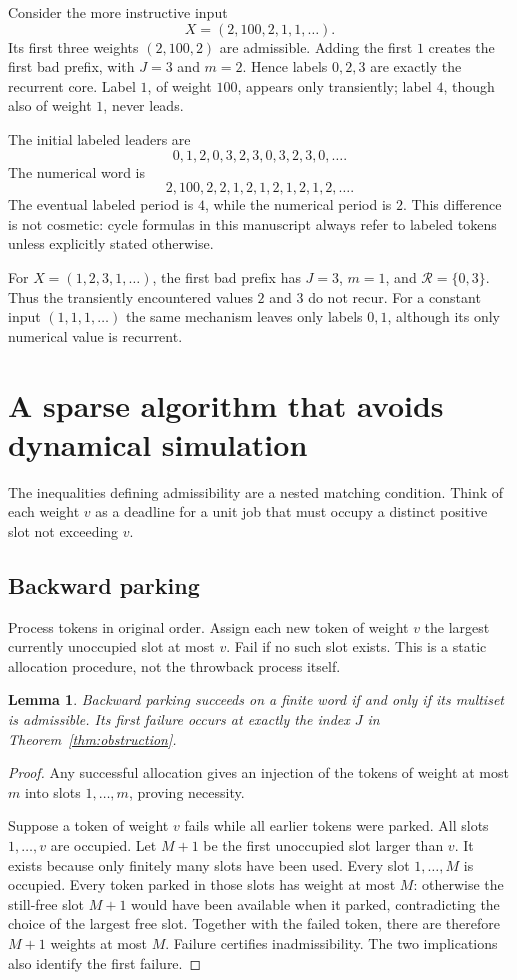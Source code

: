 \documentclass[11pt,letterpaper]{article}
\newtheorem{lemma}[theorem]{Lemma}
\theoremstyle{definition}
\newcommand{\core}{\mathcal R}
\begin{document}
Consider the more instructive input
\begin{equation}\label{eq:example100}
 X=(2,100,2,1,1,\ldots).
\end{equation}
Its first three weights $(2,100,2)$ are admissible. Adding the first $1$
creates the first bad prefix, with $J=3$ and $m=2$. Hence labels $0,2,3$
are exactly the recurrent core. Label $1$, of weight $100$, appears only
transiently; label $4$, though also of weight $1$, never leads.

The initial labeled leaders are
\[
 0,1,2,0,3,2,3,0,3,2,3,0,\ldots.
\]
The numerical word is
\[
 2,100,2,2,1,2,1,2,1,2,1,2,\ldots.
\]
The eventual labeled period is $4$, while the numerical period is $2$.
This difference is not cosmetic: cycle formulas in this manuscript always
refer to labeled tokens unless explicitly stated otherwise.

For $X=(1,2,3,1,\ldots)$, the first bad prefix has $J=3$, $m=1$, and
$\core=\{0,3\}$. Thus the transiently encountered values $2$ and $3$ do not
recur. For a constant input $(1,1,1,\ldots)$ the same mechanism leaves only
labels $0,1$, although its only numerical value is recurrent.

\section{A sparse algorithm that avoids dynamical simulation}\label{sec:algorithm}
The inequalities defining admissibility are a nested matching condition.
Think of each weight $v$ as a deadline for a unit job that must occupy a
distinct positive slot not exceeding $v$.

\subsection{Backward parking}
Process tokens in original order. Assign each new token of weight $v$ the
largest currently unoccupied slot at most $v$. Fail if no such slot exists.
This is a static allocation procedure, not the throwback process itself.

\begin{lemma}\label{lem:parking}
Backward parking succeeds on a finite word if and only if its multiset is
admissible. Its first failure occurs at exactly the index $J$ in
Theorem~\ref{thm:obstruction}.
\end{lemma}
\begin{proof}
Any successful allocation gives an injection of the tokens of weight at most
$m$ into slots $1,\ldots,m$, proving necessity.

Suppose a token of weight $v$ fails while all earlier tokens were parked.
All slots $1,\ldots,v$ are occupied. Let $M+1$ be the first unoccupied slot
larger than $v$. It exists because only finitely many slots have been used.
Every slot $1,\ldots,M$ is occupied. Every token parked in those slots has
weight at most $M$: otherwise the still-free slot $M+1$ would have been
available when it parked, contradicting the choice of the largest free slot.
Together with the failed token, there are therefore $M+1$ weights at most
$M$. Failure certifies inadmissibility. The two implications also identify
the first failure.
\end{proof}
\end{document}
